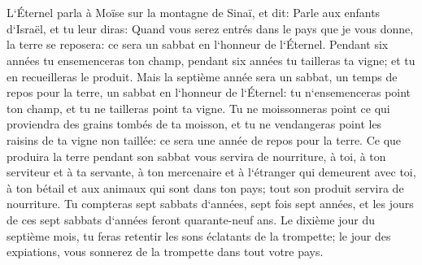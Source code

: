 \chapter{}

\verse L`Éternel parla à Moïse sur la montagne de Sinaï, et dit: 
\verse Parle aux enfants d`Israël, et tu leur diras: Quand vous serez entrés dans le pays que je vous donne, la terre se reposera: ce sera un sabbat en l`honneur de l`Éternel. 
\verse Pendant six années tu ensemenceras ton champ, pendant six années tu tailleras ta vigne; et tu en recueilleras le produit. 
\verse Mais la septième année sera un sabbat, un temps de repos pour la terre, un sabbat en l`honneur de l`Éternel: tu n`ensemenceras point ton champ, et tu ne tailleras point ta vigne. 
\verse Tu ne moissonneras point ce qui proviendra des grains tombés de ta moisson, et tu ne vendangeras point les raisins de ta vigne non taillée: ce sera une année de repos pour la terre. 
\verse Ce que produira la terre pendant son sabbat vous servira de nourriture, à toi, à ton serviteur et à ta servante, à ton mercenaire et à l`étranger qui demeurent avec toi, 
\verse à ton bétail et aux animaux qui sont dans ton pays; tout son produit servira de nourriture. 
\verse Tu compteras sept sabbats d`années, sept fois sept années, et les jours de ces sept sabbats d`années feront quarante-neuf ans. 
\verse Le dixième jour du septième mois, tu feras retentir les sons éclatants de la trompette; le jour des expiations, vous sonnerez de la trompette dans tout votre pays. 

